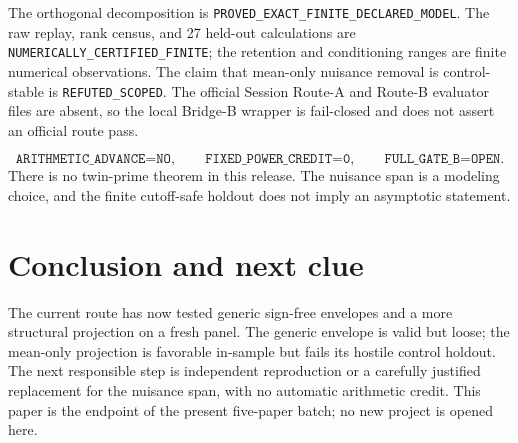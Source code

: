 \documentclass[10pt]{article}
\begin{document}
The orthogonal decomposition is
\texttt{PROVED\_EXACT\_FINITE\_DECLARED\_MODEL}.  The raw replay, rank census,
and 27 held-out calculations are \texttt{NUMERICALLY\_CERTIFIED\_FINITE}; the
retention and conditioning ranges are finite numerical observations.  The
claim that mean-only nuisance removal is control-stable is
\texttt{REFUTED\_SCOPED}.  The official Session Route-A and Route-B evaluator
files are absent, so the local Bridge-B wrapper is fail-closed and does not
assert an official route pass.

\[
 \texttt{ARITHMETIC\_ADVANCE=NO},\qquad
 \texttt{FIXED\_POWER\_CREDIT=0},\qquad
 \texttt{FULL\_GATE\_B=OPEN}.
\]
There is no twin-prime theorem in this release.  The nuisance span is a
modeling choice, and the finite cutoff-safe holdout does not imply an
asymptotic statement.

\section{Conclusion and next clue}

The current route has now tested generic sign-free envelopes and a more
structural projection on a fresh panel.  The generic envelope is valid but
loose; the mean-only projection is favorable in-sample but fails its hostile
control holdout.  The next responsible step is independent reproduction or a
carefully justified replacement for the nuisance span, with no automatic
arithmetic credit.  This paper is the endpoint of the present five-paper
batch; no new project is opened here.
\end{document}
